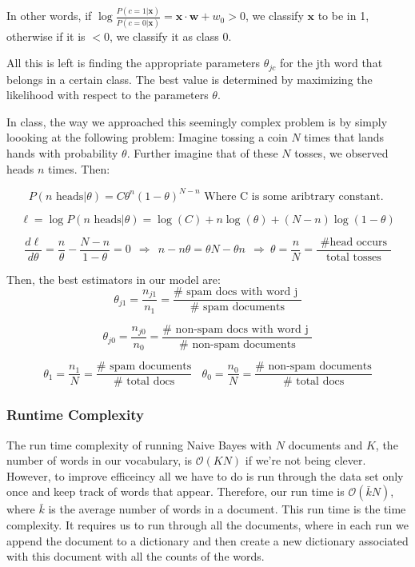 In other words, if $\log \frac{  P( c = 1 | \mathbf{x})}{P( c = 0 | \mathbf{x})} = 
\mathbf{x} \cdot \mathbf{w} + w_0 > 0$, we classify $\mathbf{x}$ to be in 1, otherwise if it is $< 0$, we classify it as class 0.  


All this is left is finding the appropriate parameters $\theta_{jc}$ for the jth word that belongs in a certain class.  The best value is determined by maximizing the likelihood with respect to the parameters $\theta$. 

In class, the way we approached this seemingly complex problem is by simply loooking at the following problem:   Imagine tossing a coin $N$ times that lands hands with probability $\theta$.  Further imagine that of these $N$ tosses, we observed heads $n$ times.  Then:

$$
P( n \text{ heads} | \theta ) = C \theta^{n} (1 - \theta)^{N -n} \text{ Where C is some aribtrary constant. }
$$


$$
\ell = \log P( n \text{ heads} | \theta ) = \log(C) +  n \log(\theta) + (N - n) \log(1 - \theta)
$$

$$
\frac{d \ell}{d \theta} = \frac{n}{\theta} - \frac{N-n}{1-\theta} = 0 ~~ \Rightarrow ~~ n - n\theta = \theta N -\theta n ~~ \Rightarrow ~ \theta = \frac{n}{N} = \frac{ \text{ \# head occurs } }{\text{ total tosses }}
$$

Then, the best estimators in our model are: 
\begin{equation}
\theta_{j1} = \frac{n_{j1} }{n_1} = \frac{\# \text{ spam docs with word j }} {\# \text{ spam documents}}
\end{equation}

\begin{equation}
\theta_{j0} = \frac{n_{j0} }{n_0} = \frac{\# \text{ non-spam docs with word j }}{\# \text{ non-spam documents}}
\end{equation}

\begin{equation}
\theta_1 = \frac{n_1}{N} = \frac{\# \text{ spam documents} }{\# \text{ total docs}} ~~~~ \theta_0 = \frac{n_0}{N} = \frac{\# \text{ non-spam documents} }{\# \text{ total docs}} 
\end{equation}

\subsubsection {Runtime Complexity}
The run time complexity of running Naive Bayes with $N$ documents and $K$, the number of words in our vocabulary, is $\mathcal{O}(KN)$ if we're not being clever. However, to improve efficeincy all we have to do is run through the data set only once and keep track of words that appear.  Therefore, our run time is $\mathcal{O}(\bar{k} N)$, where $\bar{k}$ is the average number of words in a document. This run time is the time complexity.  It requires us to run through all the documents, where in each run we append the document to a dictionary and then create a new dictionary associated with this document with all the counts of the words.  

